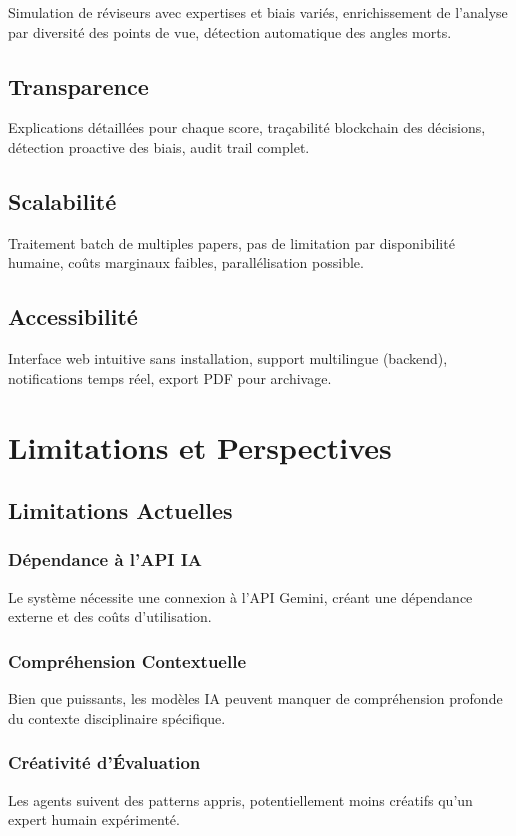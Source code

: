\documentclass[12pt,a4paper]{article}
\begin{document}
Simulation de réviseurs avec expertises et biais variés, enrichissement de l'analyse par diversité des points de vue, détection automatique des angles morts.

\subsection{Transparence}

Explications détaillées pour chaque score, traçabilité blockchain des décisions, détection proactive des biais, audit trail complet.

\subsection{Scalabilité}

Traitement batch de multiples papers, pas de limitation par disponibilité humaine, coûts marginaux faibles, parallélisation possible.

\subsection{Accessibilité}

Interface web intuitive sans installation, support multilingue (backend), notifications temps réel, export PDF pour archivage.

\section{Limitations et Perspectives}

\subsection{Limitations Actuelles}

\subsubsection{Dépendance à l'API IA}
Le système nécessite une connexion à l'API Gemini, créant une dépendance externe et des coûts d'utilisation.

\subsubsection{Compréhension Contextuelle}
Bien que puissants, les modèles IA peuvent manquer de compréhension profonde du contexte disciplinaire spécifique.

\subsubsection{Créativité d'Évaluation}
Les agents suivent des patterns appris, potentiellement moins créatifs qu'un expert humain expérimenté.
\end{document}
